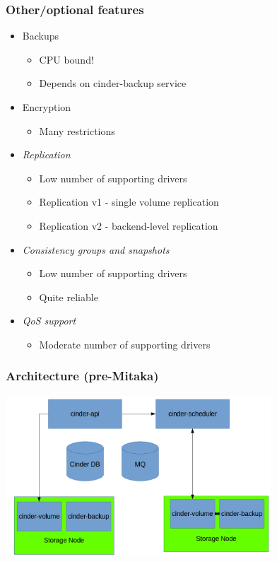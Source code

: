 \documentclass[aspectratio=169]{beamer}
\begin{document}
\begin{frame}
    \frametitle{Other/optional features}
    \begin{itemize}
        \pause
        \item Backups
        \begin{itemize}
            \item CPU bound!
            \item Depends on cinder-backup service
        \end{itemize}
        \pause
        \item Encryption
        \begin{itemize}
            \item Many restrictions 
        \end{itemize}
        \pause
        \item \emph{Replication}
        \begin{itemize}
            \item Low number of supporting drivers
            \item Replication v1 - single volume replication
            \item Replication v2 - backend-level replication
        \end{itemize}
        \pause
        \item \emph{Consistency groups and snapshots}
        \begin{itemize}
            \item Low number of supporting drivers
            \item Quite reliable
        \end{itemize}
        \pause
        \item \emph{QoS support}
        \begin{itemize}
            \item Moderate number of supporting drivers
        \end{itemize}
    \end{itemize}
\end{frame}

\begin{frame}
    \frametitle{Architecture (pre-Mitaka)}
    \begin{center}
        \includegraphics[height=6cm]{images/architecture-pre-mitaka.png}
    \end{center}
\end{frame}
\end{document}
